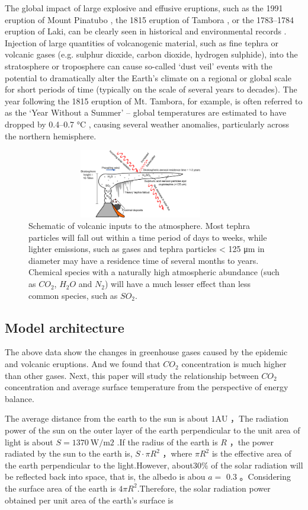 \documentclass{apmcmthesis}
\begin{document}
 The global impact of large explosive and effusive eruptions, such as the 1991 eruption of Mount Pinatubo , the 1815 eruption of Tambora , or the 1783–1784 eruption of Laki, can be clearly seen in historical and environmental records . Injection of large quantities of volcanogenic material, such as fine tephra or volcanic gases (e.g. sulphur dioxide, carbon dioxide, hydrogen sulphide), into the stratosphere or troposphere can cause so-called `dust veil’ events \cite{21} with the potential to dramatically alter the Earth's climate on a regional or global scale for short periods of time (typically on the scale of several years to decades). The year following the 1815 eruption of Mt. Tambora, for example, is often referred to as the ‘Year Without a Summer’ – global temperatures are estimated to have dropped by 0.4–0.7 °C \cite{22}, causing several weather anomalies, particularly across the northern hemisphere.
 \begin{figure} 
    \centering
    \includegraphics[width=10cm,height=3cm]{APMCMThesis/figures/volcanoe.png}
    \caption{Schematic of volcanic inputs to the atmosphere. Most tephra particles will fall out within a time period of days to weeks, while lighter emissions, such as gases and tephra particles < 125 μm in diameter may have a residence time of several months to years. Chemical species with a naturally high atmospheric abundance (such as $CO_2$, $H_2O$ and $N_2$) will have a much lesser effect than less common species, such as $SO_2$.}
\label{vol}
\end{figure}

\subsection{Model architecture}
The above data show the changes in greenhouse gases caused by the epidemic and volcanic eruptions. And we found that $CO_2$ concentration is much higher than other gases. Next, this paper will study the relationship between $CO_2$ concentration and average surface temperature from the perspective of energy balance. 

The average distance from the earth to the sun is about $1 \mathrm{AU}$ ，The radiation power of the sun on the outer layer of the earth perpendicular to the unit area of light is about $S=1370 \mathrm{~W} / \mathrm{m} 2$ .If the radius of the earth is $R$ ，the power radiated by the sun to the earth is, $S \cdot \pi R^2$ ，where  $\pi R^2$  is the effective area of the earth perpendicular to the light.However, about$30 \%$ of the solar radiation will be reflected back into space, that is, the albedo is abou $a=$ $0.3$ 。Considering the surface area of the earth is $4 \pi R^2$.Therefore, the solar radiation power obtained per unit area of the earth's surface is
\end{document}
